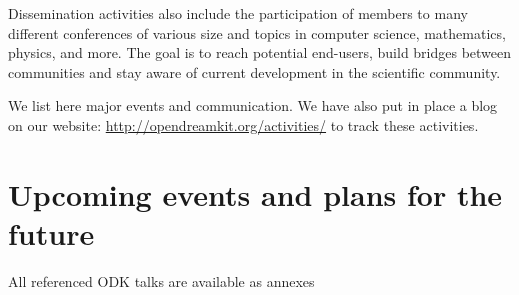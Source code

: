 \documentclass{deliverablereport}
\begin{document}
Dissemination activities also include the participation of \ODK
members to many different conferences of various size and topics
in computer science, mathematics, physics, and more. The goal is
to reach potential end-users, build bridges between communities and stay aware 
of current development in the scientific community.

We list here major events and communication. We have also put in place
a blog on our website: \url{http://opendreamkit.org/activities/} to track
these activities.


\section{Upcoming events and plans for the future}


\newpage\printbibliography

{\footnotesize All referenced ODK talks are available as annexes}
\end{document}
